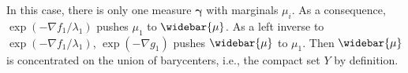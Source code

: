In this case, there is only one measure $\boldsymbol{\gamma}$ with marginals $\mu_i$.
As a consequence, $\exp(-\nabla f_1 / \lambda_1)$ pushes $\mu_1$ to $\widebar{\mu}$.
As a left inverse to $\exp(-\nabla f_1/\lambda_1)$,
\(\exp(-\nabla g_1)\) pushes $\widebar{\mu}$ to $\mu_1$.
Then $\widebar{\mu}$ is concentrated on the union of barycenters,
i.e., the compact set $Y$ by definition.
